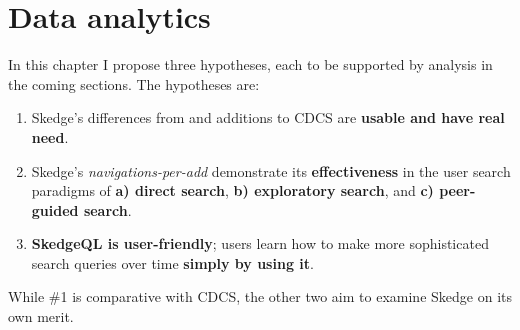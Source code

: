 
\chapter{Data analytics}

In this chapter I propose three hypotheses, each to be supported by analysis in the coming sections. The hypotheses are:

\begin{enumerate}
  \item Skedge's differences from and additions to CDCS are \textbf{usable and have real need}.

  \item Skedge’s \emph{navigations-per-add} demonstrate its \textbf{effectiveness} in the user search paradigms of \textbf{a) direct search}, \textbf{b) exploratory search}, and \textbf{c) peer-guided search}.

  \item \textbf{SkedgeQL is user-friendly}; users learn how to make more sophisticated search queries over time \textbf{simply by using it}.
\end{enumerate}

\noindent While \#1 is comparative with CDCS, the other two aim to examine Skedge on its own merit.


\clearpage


\clearpage


\clearpage

